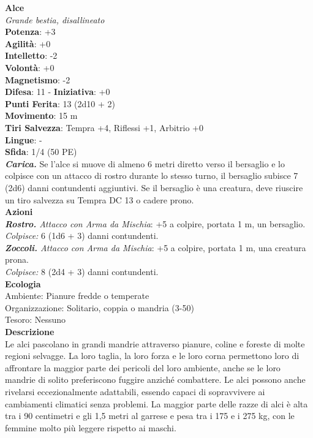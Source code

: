 \begin{multicols}{2}
\medskip\textbf{Alce}\\
\emph{Grande bestia, disallineato}\\
\textbf{Potenza}: +3\\
\textbf{Agilità}: +0\\
\textbf{Intelletto}: -2\\
\textbf{Volontà}: +0\\
\textbf{Magnetismo}: -2\\
\textbf{Difesa}: 11 - \textbf{Iniziativa}: +0\\
\textbf{Punti Ferita}: 13 (2d10 + 2)\\
\textbf{Movimento}: 15 m\\
\textbf{Tiri Salvezza}:  Tempra +4, Riflessi +1, Arbitrio +0\\
\textbf{Lingue}: -\\
\textbf{Sfida}: 1/4 (50 PE)\smallskip\\
\emph{\textbf{Carica.}} Se l'alce si muove di almeno 6 metri diretto verso il bersaglio e lo colpisce con un attacco di rostro durante lo stesso turno, il bersaglio subisce 7 (2d6) danni contundenti aggiuntivi. Se il bersaglio è una creatura, deve riuscire un tiro salvezza su Tempra DC 13 o cadere prono.\\
\smallskip\textbf{Azioni}\\
\emph{\textbf{Rostro.} Attacco con Arma da Mischia}: +5 a colpire, portata 1 m, un bersaglio.\\
\emph{Colpisce:} 6 (1d6 + 3) danni contundenti.\\
\emph{\textbf{Zoccoli.} Attacco con Arma da Mischia}: +5 a colpire, portata 1 m, una creatura prona.\\
\emph{Colpisce:} 8 (2d4 + 3) danni contundenti.\\
\textbf{Ecologia}\\
Ambiente: Pianure fredde o temperate\\
Organizzazione: Solitario, coppia o mandria (3-50)\\
Tesoro: Nessuno\\
\textbf{Descrizione}\\
Le alci pascolano in grandi mandrie attraverso pianure, coline e foreste di molte regioni selvagge. La loro taglia, la loro forza e le loro corna permettono loro di affrontare la maggior parte dei pericoli del loro ambiente, anche se le loro mandrie di solito preferiscono fuggire anziché combattere. Le alci possono anche rivelarsi eccezionalmente adattabili, essendo capaci di sopravvivere ai cambiamenti climatici senza problemi. La maggior parte delle razze di alci è alta tra i 90 centimetri e gli 1,5 metri al garrese e pesa tra i 175 e i 275 kg, con le femmine molto più leggere rispetto ai maschi.\\


\end{multicols}
